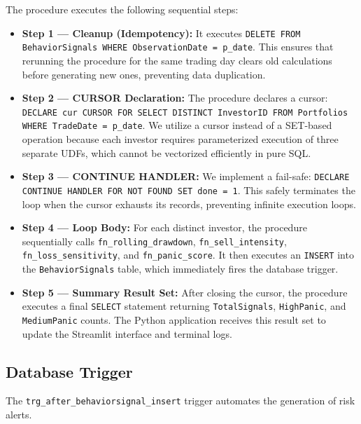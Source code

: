 The procedure executes the following sequential steps:
\begin{itemize}
    \item \textbf{Step 1 — Cleanup (Idempotency):} It executes \texttt{DELETE FROM BehaviorSignals WHERE ObservationDate = p\_date}. This ensures that rerunning the procedure for the same trading day clears old calculations before generating new ones, preventing data duplication.
    \item \textbf{Step 2 — CURSOR Declaration:} The procedure declares a cursor: \texttt{DECLARE cur CURSOR FOR SELECT DISTINCT InvestorID FROM Portfolios WHERE TradeDate = p\_date}. We utilize a cursor instead of a SET-based operation because each investor requires parameterized execution of three separate UDFs, which cannot be vectorized efficiently in pure SQL.
    \item \textbf{Step 3 — CONTINUE HANDLER:} We implement a fail-safe: \texttt{DECLARE CONTINUE HANDLER FOR NOT FOUND SET done = 1}. This safely terminates the loop when the cursor exhausts its records, preventing infinite execution loops.
    \item \textbf{Step 4 — Loop Body:} For each distinct investor, the procedure sequentially calls \texttt{fn\_rolling\_drawdown}, \texttt{fn\_sell\_intensity}, \texttt{fn\_loss\_sensitivity}, and \texttt{fn\_panic\_score}. It then executes an \texttt{INSERT} into the \texttt{BehaviorSignals} table, which immediately fires the database trigger.
    \item \textbf{Step 5 — Summary Result Set:} After closing the cursor, the procedure executes a final \texttt{SELECT} statement returning \texttt{TotalSignals}, \texttt{HighPanic}, and \texttt{MediumPanic} counts. The Python application receives this result set to update the Streamlit interface and terminal logs.
\end{itemize}

\subsection{Database Trigger}
The \texttt{trg\_after\_behaviorsignal\_insert} trigger automates the generation of risk alerts. 

